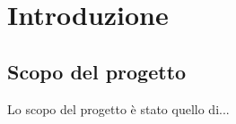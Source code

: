 \documentclass[../report.tex]{subfiles}
\begin{document}
\chapter{Introduzione}\label{c:introduzione}
\section{Scopo del progetto}\label{s:scopo-progetto}
Lo scopo del progetto è stato quello di...\\
\end{document}
